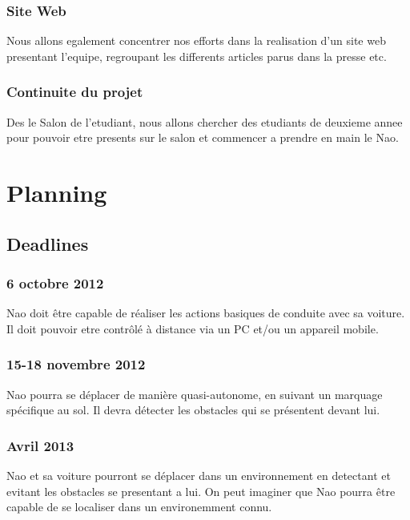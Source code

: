 \documentclass[11pt]{report} %
\begin{document}
		\subsection{Site Web}
			Nous allons egalement concentrer nos efforts dans la realisation d'un site web presentant l'equipe, regroupant les differents articles parus dans la presse etc.
		\subsection{Continuite du projet}
			Des le Salon de l'etudiant, nous allons chercher des etudiants de deuxieme annee pour pouvoir etre presents sur le salon et commencer a prendre en main le Nao.
\chapter{Planning}
	\section{Deadlines}
		\subsection{6 octobre 2012}
			Nao doit être capable de réaliser les actions basiques de conduite avec sa voiture.\\
			Il doit pouvoir etre contrôlé à distance via un PC et/ou un appareil mobile.
		\subsection{15-18 novembre 2012}
			Nao pourra se déplacer de manière quasi-autonome, en suivant un marquage spécifique au sol.
			Il devra détecter les obstacles qui se présentent devant lui.
		\subsection{Avril 2013}
			Nao et sa voiture pourront se déplacer dans un environnement en detectant et evitant les obstacles se presentant a lui.
			On peut imaginer que Nao pourra être capable de se localiser dans un environemment connu.
\end{document}
